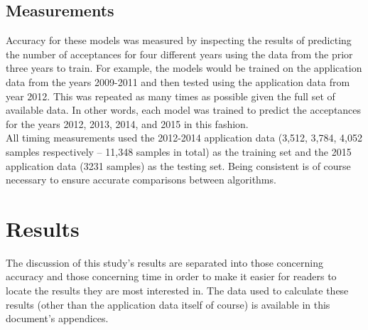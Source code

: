 \documentclass[titlepage]{article}
\begin{document}
\subsection{Measurements}
Accuracy for these models was measured by inspecting the results of predicting the number of acceptances for four different years using the data from the prior three years to train. For example, the models would be trained on the application data from the years 2009-2011 and then tested using the application data from year 2012. This was repeated as many times as possible given the full set of available data. In other words, each model was trained to predict the acceptances for the years 2012, 2013, 2014, and 2015 in this fashion.\\
All timing measurements used the 2012-2014 application data (3,512, 3,784, 4,052 samples respectively -- 11,348 samples in total) as the training set and the 2015 application data (3231 samples) as the testing set. Being consistent is of course necessary to ensure accurate comparisons between algorithms.



\newpage
\section{Results}
The discussion of this study's results are separated into those concerning accuracy and those concerning time in order to make it easier for readers to locate the results they are most interested in. The data used to calculate these results (other than the application data itself of course) is available in this document's appendices.
\end{document}
